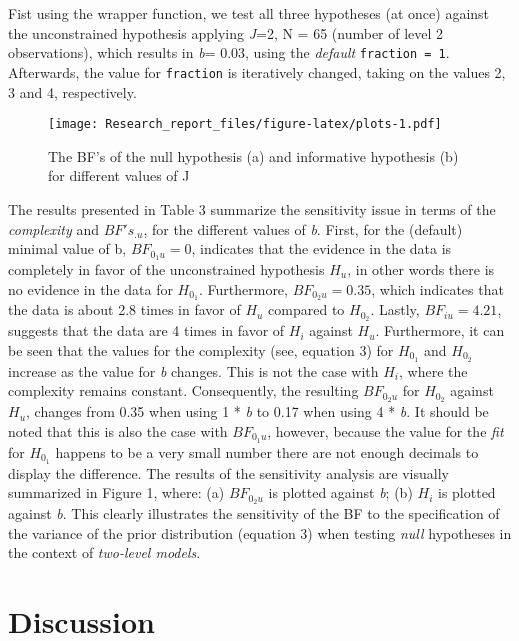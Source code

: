 \documentclass[
  english,
  man]{apa6}
\begin{document}
Fist using the wrapper function, we test all three hypotheses (at once) against the unconstrained hypothesis applying \emph{J}=2, N = 65 (number of level 2 observations), which results in \emph{b}= 0.03, using the \emph{default} \texttt{fraction\ =\ 1}. Afterwards, the value for \texttt{fraction} is iteratively changed, taking on the values 2, 3 and 4, respectively.

\begin{figure}
\centering
\texttt{[image: Research\_report\_files/figure-latex/plots-1.pdf]}
\caption{\label{fig:plots}The BF's of the null hypothesis (a) and informative hypothesis (b) for different values of J}
\end{figure}

The results presented in Table 3 summarize the sensitivity issue in terms of the \emph{complexity} and \(BF's_{.u}\), for the different values of \emph{b}. First, for the (default) minimal value of b, \(BF_{0_1u} = 0\), indicates that the evidence in the data is completely in favor of the unconstrained hypothesis \(H_u\), in other words there is no evidence in the data for \(H_{0_1}\). Furthermore, \(BF_{0_2u} = 0.35\), which indicates that the data is about 2.8 times in favor of \(H_u\) compared to \(H_{0_2}\). Lastly, \(BF_{iu} = 4.21\), suggests that the data are 4 times in favor of \(H_{i}\) against \(H_u\).
Furthermore, it can be seen that the values for the complexity (see, equation 3) for \(H_{0_1}\) and \(H_{0_2}\) increase as the value for \emph{b} changes. This is not the case with \(H_i\), where the complexity remains constant. Consequently, the resulting \(BF_{0_{2}u}\) for \(H_{0_2}\) against \(H_u\), changes from 0.35 when using 1 * \emph{b} to 0.17 when using 4 * \emph{b}. It should be noted that this is also the case with \(BF_{0_{1}u}\), however, because the value for the \emph{fit} for \(H_{0_1}\) happens to be a very small number there are not enough decimals to display the difference. The results of the sensitivity analysis are visually summarized in Figure 1, where: (a) \(BF_{0_{2}u}\) is plotted against \emph{b}; (b) \(H_i\) is plotted against \emph{b}. This clearly illustrates the sensitivity of the BF to the specification of the variance of the prior distribution (equation 3) when testing \emph{null} hypotheses in the context of \emph{two-level models}.

\hypertarget{discussion}{%
\section{Discussion}\label{discussion}}
\end{document}
